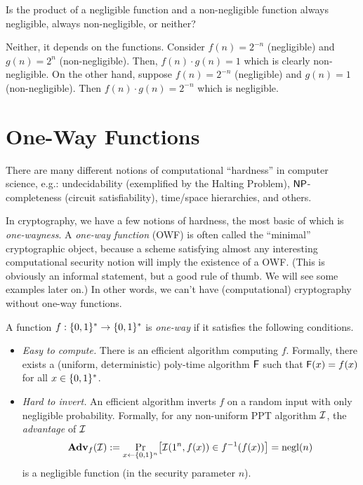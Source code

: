 \documentclass[11pt]{article}
\begin{document}
\begin{question}
    Is the product of a negligible function and a non-negligible function always
    negligible, always non-negligible, or neither?
\end{question}
\begin{answer}
    Neither, it depends on the functions. Consider \(f(n) = 2^{-n}\) (negligible) and
    \(g(n) = 2^n\) (non-negligible).  Then, \(f(n) \cdot g(n) = 1\) which is clearly
    non-negligible. On the other hand, suppose \(f(n) = 2^{-n}\) (negligible) and \(g(n)
    = 1\) (non-negligible). Then \(f(n) \cdot g(n) = 2^{-n}\) which is negligible.
\end{answer}

\section{One-Way Functions}
\label{sec:one-way-functions}

There are many different notions of computational ``hardness'' in
computer science, e.g.: undecidability (exemplified by the Halting
Problem), $\mathsf{NP}$-completeness (circuit satisfiability), time/space
hierarchies, and others.

In cryptography, we have a few notions of hardness, the most basic of
which is \emph{one-wayness}.  A \emph{one-way function} (OWF) is often
called the ``minimal'' cryptographic object, because a scheme
satisfying almost any interesting computational security notion will
imply the existence of a OWF.  (This is obviously an informal
statement, but a good rule of thumb.  We will see some examples later
on.)  In other words, we can't have (computational) cryptography
without one-way functions.

\begin{definition}
  \label{def:owf}
  A function $f : \{0,1\}^{*} \to \{0,1\}^{*}$ is \emph{one-way} if it
  satisfies the following conditions.
  \begin{itemize}
  \item \emph{Easy to compute.}  There is an efficient algorithm
    computing $f$.  Formally, there exists a (uniform, deterministic)
    poly-time algorithm $\mathsf{F}$ such that $\mathsf{F}(x) = f(x)$ for
    all $x \in \{0,1\}^{*}$.
  \item \emph{Hard to invert.}  An efficient algorithm inverts $f$ on
    a random input with only negligible probability.  Formally, for
    any non-uniform PPT algorithm $\mathcal{I}$, the \emph{advantage} of
    $\mathcal{I}$ \[ \advan_{f}(\Inv) := \Pr_{x \gets \bit^{n}} \bracks*{
      \Inv(1^{n}, f(x)) \in f^{-1}(f(x)) } = \negl(n) \] is a
    negligible function (in the security parameter $n$).
  \end{itemize}
\end{definition}
\end{document}
